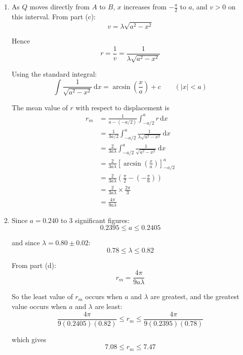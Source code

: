 \documentclass[leqno]{article}
\begin{document}
\begin{enumerate}[
  label=\textbf{\arabic*.},
  leftmargin=*,
  topsep=0pt,
  partopsep=0pt,
  parsep=0pt
]
\begin{djsSolution}
\begin{enumerate}[label=\textbf{(\alph*)}]
  Then
  \[
  x=a\cos\theta,\qquad v=-a\lambda \sin\theta
  \]

  so
  \begin{align*}
  v^2&=a^2\lambda^2\sin^2\theta\\
     &=a^2\lambda^2(1-\cos^2\theta)\\
     &=\lambda^2(a^2-x^2)
  \end{align*}

  \item As $Q$ moves directly from $A$ to $B$, $x$ increases from $-\frac{a}{2}$ to $a$, and $v>0$ on this interval. From part (c):
  \[
  v=\lambda\sqrt{a^2-x^2}
  \]

  Hence
  \[
  r=\frac{1}{v}=\frac{1}{\lambda\sqrt{a^2-x^2}}
  \]

  Using the standard integral:
  \[
  \int \frac{1}{\sqrt{a^2-x^2}}\,\mathrm{d}x=\arcsin\left(\frac{x}{a}\right)+c\qquad (|x|<a)
  \]

  The mean value of $r$ with respect to displacement is
  \begin{align*}
  r_m&=\frac{1}{a-(-a/2)}\int_{-a/2}^{a} r\,\mathrm{d}x\\
     &=\frac{1}{3a/2}\int_{-a/2}^{a}\frac{1}{\lambda\sqrt{a^2-x^2}}\,\mathrm{d}x\\
     &=\frac{2}{3a\lambda}\int_{-a/2}^{a}\frac{1}{\sqrt{a^2-x^2}}\,\mathrm{d}x\\
     &=\frac{2}{3a\lambda}\left[\arcsin\left(\frac{x}{a}\right)\right]_{-a/2}^{a}\\
     &=\frac{2}{3a\lambda}\left(\frac{\pi}{2}-\left(-\frac{\pi}{6}\right)\right)\\
     &=\frac{2}{3a\lambda}\times\frac{2\pi}{3}\\
     &=\frac{4\pi}{9a\lambda}
  \end{align*}

  \item Since $a=0.240$ to 3 significant figures:
  \[
  0.2395\le a\le 0.2405
  \]

  and since $\lambda=0.80\pm 0.02$:
  \[
  0.78\le \lambda\le 0.82
  \]

  From part (d):
  \[
  r_m=\frac{4\pi}{9a\lambda}
  \]

  So the least value of $r_m$ occurs when $a$ and $\lambda$ are greatest, and the greatest value occurs when $a$ and $\lambda$ are least:
  \[
  \frac{4\pi}{9(0.2405)(0.82)}\le r_m\le \frac{4\pi}{9(0.2395)(0.78)}
  \]

  which gives
  \[
  7.08\le r_m\le 7.47
  \]


\end{enumerate}
\end{djsSolution}
\end{enumerate}
\end{document}
